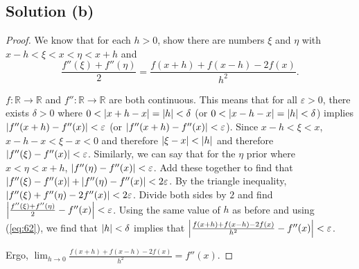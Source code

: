 \documentclass[11pt]{article}
\begin{document}
    \subsection{Solution (b)}
        \begin{proof}
            We know that for each $h > 0$, show there are numbers $\xi$ and $\eta$ with $x - h < \xi < x < \eta < x + h$ and
            \begin{equation}\label{eq:62}
                \frac{f''(\xi) + f''(\eta)}{2} = \frac{f(x + h) + f(x - h) - 2f(x)}{h^2}.
            \end{equation}

            $f: \mathbb{R} \to \mathbb{R}$ and $f'': \mathbb{R} \to \mathbb{R}$ are both continuous.
            This means that for all $\varepsilon > 0$, there exists $\delta > 0$ where $0 < \left| x + h - x \right| = \left| h \right| < \delta$ (or $0 < \left| x - h - x \right| = \left| h \right| < \delta$) implies $\left| f''(x + h) - f''(x) \right| < \varepsilon$ (or $\left| f''(x + h) - f''(x) \right| < \varepsilon$).
            Since $x - h < \xi < x$, $x - h - x < \xi - x < 0$ and therefore $\left| \xi - x \right| < \left| h \right|$ and therefore $\left| f''(\xi) - f''(x) \right| < \varepsilon$.
            Similarly, we can say that for the $\eta$ prior where $x < \eta < x + h$, $\left| f''(\eta) - f''(x) \right| < \varepsilon$.
            Add these together to find that $\left| f''(\xi) - f''(x) \right| + \left| f''(\eta) - f''(x) \right| < 2\varepsilon$.
            By the triangle inequality, $\left| f''(\xi) + f''(\eta) - 2f''(x) \right| < 2\varepsilon$.
            Divide both sides by $2$ and find $\left| \frac{f''(\xi) + f''(\eta)}{2} - f''(x) \right| < \varepsilon$.
            Using the same value of $h$ as before and using (\ref{eq:62}), we find that $\left| h \right| < \delta$ implies that $\left| \frac{f(x + h) + f(x - h) - 2f(x)}{h^2} - f''(x) \right| < \varepsilon$.
            
            Ergo, $\lim_{h \to 0} \frac{f(x + h) + f(x - h) - 2f(x)}{h^2} = f''(x)$.
        \end{proof}
\end{document}

